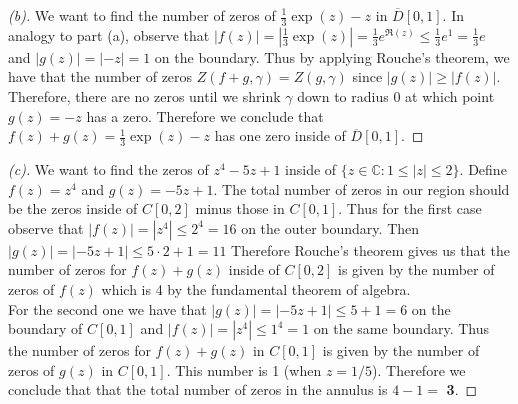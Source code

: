 \documentclass[a4paper, 11pt]{article}
\newcommand{\C}{\mathbb{C}}
\begin{document}
	\begin{proof}[(b)]
			We want to find the number of zeros of $\frac{1}{3}\exp(z)-z$ in $\overline{D}[0,1]$. In analogy to part (a), observe that $|f(z)|=|\frac{1}{3}\exp(z)|=\frac{1}{3}e^{\Re(z)} \leq\frac{1}{3}e^{1} = \frac{1}{3}e$ and $|g(z)|=|-z|=1$ on the boundary. Thus by applying Rouche's theorem, we have that the number of zeros $Z(f+g, \gamma) = Z(g, \gamma)$ since $|g(z)|\geq |f(z)|$. Therefore, there are no zeros until we shrink $\gamma$ down to radius $0$ at which point $g(z)=-z$ has a zero. Therefore we conclude that $f(z)+g(z) = \frac{1}{3}\exp(z)-z$ has one zero inside of $\overline{D}[0,1]$. 
	\end{proof}
	
	\begin{proof}[(c)]
		We want to find the zeros of $z^4-5z+1$ inside of $\{z\in\C:1\leq |z| \leq 2 \}$. Define $f(z) = z^4$ and $g(z) = -5z+1$. The total number of zeros in our region should be the zeros inside of $C[0,2]$ minus those in $C[0,1]$. Thus for the first case observe that $|f(z)| = |z^4| \leq 2^4 = 16$ on the outer boundary. Then $|g(z)| = |-5z+1|\leq 5\cdot 2 + 1 = 11$ Therefore Rouche's theorem gives us that the number of zeros for $f(z)+g(z)$ inside of $C[0,2]$ is given by the number of zeros of $f(z)$ which is 4 by the fundamental theorem of algebra. \\
		
		\noindent For the second one we have that $|g(z)| = |-5z+1| \leq 5+1 = 6$ on the boundary of $C[0,1]$ and $|f(z)| = |z^4|\leq 1^4 = 1$ on the same boundary. Thus the number of zeros for $f(z)+g(z)$ in $C[0,1]$ is given by the number of zeros of $g(z)$ in $C[0,1]$. This number is 1 (when $z=1/5$). Therefore we conclude that that the total number of zeros in the annulus is $4-1 =$ \textbf{3}. 
	
	\end{proof} 
	
	
	
	
	
	
	
	
	
	
	
	
	
	
	
	
	
	
	
	
	
\end{document}
